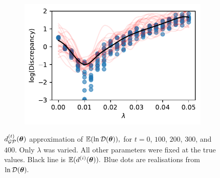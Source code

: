 \begin{figure}[htbp]
\begin{subfigure}[b]{0.5\textwidth}
        \includegraphics[width=\textwidth]{
            ../champagne_GP_images/lambda_slice_400_bolfi_updates_log_discrep.pdf
        }
    \end{subfigure}
    \caption{
        $d_{\mathcal{GP}}^{(t)}(\bm{\theta})$ approximation of $\operatorname{\mathbb{E}}(\ln\mathcal{D}(\bm{\theta})),$ 
        for $t= 0$, $100$, $200$, $300$, and $400.$ Only $\lambda$ was 
        varied. All other parameters were fixed at the true values. Black line 
        is
        $\operatorname{\mathbb{E}}(d^{(i)}(\bm{\theta})).$
        Blue dots are realisations from $\ln\mathcal{D}(\bm{\theta}).$
    }
\end{figure}

